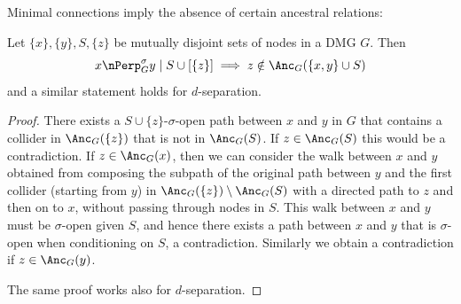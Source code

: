 Minimal connections imply the absence of certain ancestral relations:
\begin{Prp}\label{prp:min_con}
Let $\{x\},\{y\},S,\{z\}$ be mutually disjoint sets of nodes in a DMG $G$. Then
$$x \nPerp_G^\sigma y \mid S \cup [\{z\}] \implies z \notin \Anc_{G}(\{x, y\} \cup S)$$
and a similar statement holds for $d$-separation.
\end{Prp}
\begin{proof}
There exists a $S \cup \{z\}$-$\sigma$-open path between $x$ and $y$ in $G$ that contains a collider in $\Anc_{G}(\{z\})$ that is not in $\Anc_{G}(S)$. 
If $z \in \Anc_{G}(S)$ this would be a contradiction.
If $z \in \Anc_{G}(x)$, then we can consider the walk between $x$ and $y$ obtained from composing the subpath of the original path between $y$ and the first collider (starting from $y$) in $\Anc_{G}(\{z\}) \setminus \Anc_{G}(S)$ with a directed path to $z$ and then on to $x$, without passing through nodes in $S$.
This walk between $x$ and $y$ must be $\sigma$-open given $S$, and hence there exists a path between $x$ and $y$ that is $\sigma$-open when conditioning on $S$, a contradiction.
Similarly we obtain a contradiction if $z \in \Anc_{G}(y)$.

The same proof works also for $d$-separation.
\end{proof}

